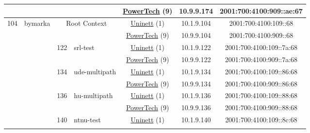 \begin{small}
\begin{center}
\begin{longtable}{|c|c|c|c|c|c|c|c|}
  &  &  &  & \multicolumn{2}{|c|}{\tiny{\href{http://www.powertech.no}{PowerTech} (9)}} & \tiny{10.9.9.174} & \tiny{2001:700:4100:909::ae:67} \\ \hline
 \multirow{20}{*}{\tiny{104}} & \multicolumn{1}{|l|}{\multirow{20}{*}{\tiny{bymarka}}} & \multicolumn{2}{|c|}{\multirow{2}{*}{\tiny{Root Context}}} & \multicolumn{2}{|c|}{\tiny{\href{https://www.uninett.no}{Uninett} (1)}} & \tiny{10.1.9.104} & \tiny{2001:700:4100:109::68} \\* \cline{5-5}\cline{6-6}\cline{7-7}\cline{8-8}
  &  & \multicolumn{2}{|c|}{} & \multicolumn{2}{|c|}{\tiny{\href{http://www.powertech.no}{PowerTech} (9)}} & \tiny{10.9.9.104} & \tiny{2001:700:4100:909::68} \\* \cline{3-3}\cline{4-4}\cline{5-5}\cline{6-6}\cline{7-7}\cline{8-8}
  &  & \multirow{2}{*}{\tiny{122}} & \multicolumn{1}{|l|}{\multirow{2}{*}{\tiny{srl-test}}} & \multicolumn{2}{|c|}{\tiny{\href{https://www.uninett.no}{Uninett} (1)}} & \tiny{10.1.9.122} & \tiny{2001:700:4100:109::7a:68} \\* \cline{5-5}\cline{6-6}\cline{7-7}\cline{8-8}
  &  &  &  & \multicolumn{2}{|c|}{\tiny{\href{http://www.powertech.no}{PowerTech} (9)}} & \tiny{10.9.9.122} & \tiny{2001:700:4100:909::7a:68} \\* \cline{3-3}\cline{4-4}\cline{5-5}\cline{6-6}\cline{7-7}\cline{8-8}
  &  & \multirow{2}{*}{\tiny{134}} & \multicolumn{1}{|l|}{\multirow{2}{*}{\tiny{ude-multipath}}} & \multicolumn{2}{|c|}{\tiny{\href{https://www.uninett.no}{Uninett} (1)}} & \tiny{10.1.9.134} & \tiny{2001:700:4100:109::86:68} \\* \cline{5-5}\cline{6-6}\cline{7-7}\cline{8-8}
  &  &  &  & \multicolumn{2}{|c|}{\tiny{\href{http://www.powertech.no}{PowerTech} (9)}} & \tiny{10.9.9.134} & \tiny{2001:700:4100:909::86:68} \\* \cline{3-3}\cline{4-4}\cline{5-5}\cline{6-6}\cline{7-7}\cline{8-8}
  &  & \multirow{2}{*}{\tiny{136}} & \multicolumn{1}{|l|}{\multirow{2}{*}{\tiny{hu-multipath}}} & \multicolumn{2}{|c|}{\tiny{\href{https://www.uninett.no}{Uninett} (1)}} & \tiny{10.1.9.136} & \tiny{2001:700:4100:109::88:68} \\* \cline{5-5}\cline{6-6}\cline{7-7}\cline{8-8}
  &  &  &  & \multicolumn{2}{|c|}{\tiny{\href{http://www.powertech.no}{PowerTech} (9)}} & \tiny{10.9.9.136} & \tiny{2001:700:4100:909::88:68} \\* \cline{3-3}\cline{4-4}\cline{5-5}\cline{6-6}\cline{7-7}\cline{8-8}
  &  & \multirow{2}{*}{\tiny{140}} & \multicolumn{1}{|l|}{\multirow{2}{*}{\tiny{ntnu-test}}} & \multicolumn{2}{|c|}{\tiny{\href{https://www.uninett.no}{Uninett} (1)}} & \tiny{10.1.9.140} & \tiny{2001:700:4100:109::8c:68} \\* \cline{5-5}\cline{6-6}\cline{7-7}\cline{8-8}

\end{longtable}
\end{center}
\end{small}
